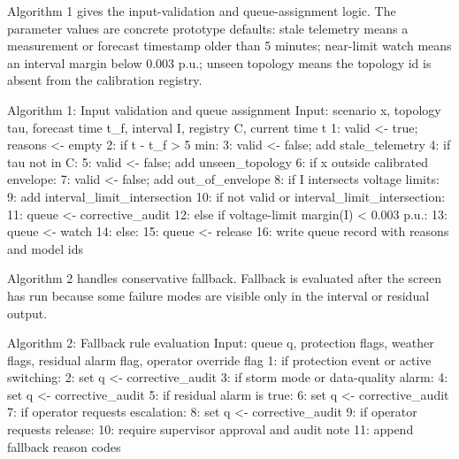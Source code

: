 \documentclass[
  preprint,12pt]{elsarticle}
\newenvironment{Shaded}{}{}
\newcommand{\NormalTok}[1]{#1}
\begin{document}
Algorithm 1 gives the input-validation and queue-assignment logic. The
parameter values are concrete prototype defaults: stale telemetry means
a measurement or forecast timestamp older than 5 minutes; near-limit
watch means an interval margin below 0.003 p.u.; unseen topology means
the topology id is absent from the calibration registry.

\begin{Shaded}
\begin{Highlighting}[]
\NormalTok{Algorithm 1: Input validation and queue assignment}
\NormalTok{Input: scenario x, topology tau, forecast time t\_f,}
\NormalTok{       interval I, registry C, current time t}
\NormalTok{1: valid \textless{}{-} true; reasons \textless{}{-} empty}
\NormalTok{2: if t {-} t\_f \textgreater{} 5 min:}
\NormalTok{3:     valid \textless{}{-} false; add stale\_telemetry}
\NormalTok{4: if tau not in C:}
\NormalTok{5:     valid \textless{}{-} false; add unseen\_topology}
\NormalTok{6: if x outside calibrated envelope:}
\NormalTok{7:     valid \textless{}{-} false; add out\_of\_envelope}
\NormalTok{8: if I intersects voltage limits:}
\NormalTok{9:     add interval\_limit\_intersection}
\NormalTok{10: if not valid or interval\_limit\_intersection:}
\NormalTok{11:     queue \textless{}{-} corrective\_audit}
\NormalTok{12: else if voltage{-}limit margin(I) \textless{} 0.003 p.u.:}
\NormalTok{13:     queue \textless{}{-} watch}
\NormalTok{14: else:}
\NormalTok{15:     queue \textless{}{-} release}
\NormalTok{16: write queue record with reasons and model ids}
\end{Highlighting}
\end{Shaded}

Algorithm 2 handles conservative fallback. Fallback is evaluated after
the screen has run because some failure modes are visible only in the
interval or residual output.

\begin{Shaded}
\begin{Highlighting}[]
\NormalTok{Algorithm 2: Fallback rule evaluation}
\NormalTok{Input: queue q, protection flags, weather flags,}
\NormalTok{       residual alarm flag, operator override flag}
\NormalTok{1: if protection event or active switching:}
\NormalTok{2:     set q \textless{}{-} corrective\_audit}
\NormalTok{3: if storm mode or data{-}quality alarm:}
\NormalTok{4:     set q \textless{}{-} corrective\_audit}
\NormalTok{5: if residual alarm is true:}
\NormalTok{6:     set q \textless{}{-} corrective\_audit}
\NormalTok{7: if operator requests escalation:}
\NormalTok{8:     set q \textless{}{-} corrective\_audit}
\NormalTok{9: if operator requests release:}
\NormalTok{10:    require supervisor approval and audit note}
\NormalTok{11: append fallback reason codes}
\end{Highlighting}
\end{Shaded}
\end{document}
